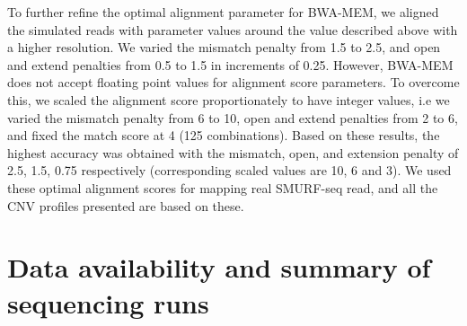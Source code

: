 To further refine the optimal alignment parameter for BWA-MEM, we
aligned the simulated reads with parameter values around the value
described above with a higher resolution. We varied the mismatch penalty
from 1.5 to 2.5, and open and extend penalties from 0.5 to 1.5 in
increments of 0.25.
%
However, BWA-MEM does not accept floating point values for alignment
score parameters. To overcome this, we scaled the alignment score
proportionately to have integer values, i.e we varied the mismatch
penalty from 6 to 10, open and extend penalties from 2 to 6, and fixed
the match score at 4 (125 combinations).
%
Based on these results, the highest accuracy was obtained with the
mismatch, open, and extension penalty of 2.5, 1.5, 0.75 respectively
(corresponding scaled values are 10, 6 and 3). We used these optimal
alignment scores for mapping real SMURF-seq read, and all the CNV
profiles presented are based on these.



\chapter{Data availability and summary of sequencing runs}
\label{appendC}

